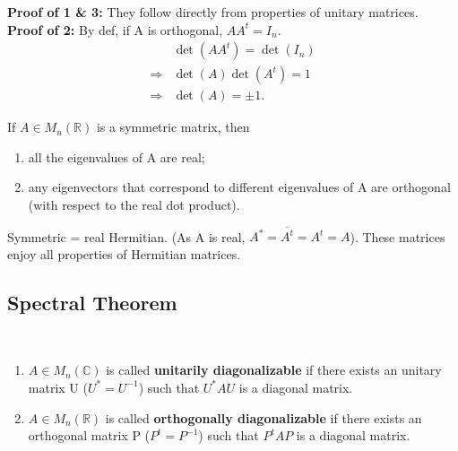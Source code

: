 \begin{pfbox}
\textbf{Proof of 1 \& 3:} They follow directly from properties of unitary matrices. \\
\textbf{Proof of 2:} By def, if A is orthogonal, $AA^{t}=I_{n}$.
\begin{align*}
&\det(AA^{t}) = \det(I_{n})\\ \Rightarrow 
&\det(A)\det(A^{t}) = 1\\ \Rightarrow 
&\det(A) = \pm 1.
\end{align*}
\end{pfbox}

\begin{theorem}
If $A\in M_{n}(\mathbb{R})$ is a symmetric matrix, then
\begin{enumerate}
    \item all the eigenvalues of A are real;
    \item any eigenvectors that correspond to different eigenvalues of A are orthogonal (with respect to the real dot product).
\end{enumerate}

\end{theorem}

\begin{pfbox}
Symmetric = real Hermitian. (As A is real, $A^* = \overline{A^t} = A^t = A$).
These matrices enjoy all properties of Hermitian matrices.
\end{pfbox}



\subsection{Spectral Theorem}

\begin{definition}\ \vspace{-2em}
\begin{enumerate}
    \item $A\in M_{n}(\mathbb{C})$ is called \textbf{unitarily diagonalizable} if there exists an unitary matrix U ($U^* = U^{-1}$) such that $U^{*}AU$ is a diagonal matrix.
    \item $A\in M_{n}(\mathbb{R})$ is called \textbf{orthogonally diagonalizable} if there exists an orthogonal matrix P ($P^t = P^{-1}$) such that $P^{t}AP$ is a diagonal matrix.
\end{enumerate}
\end{definition}



